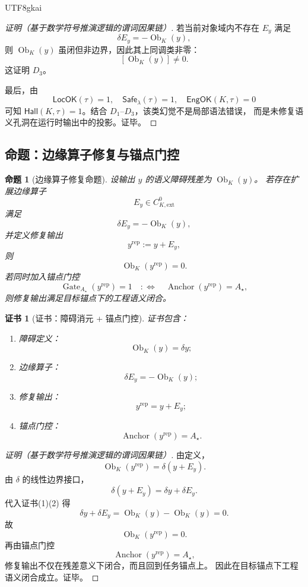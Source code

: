\documentclass[12pt]{article}
\newtheorem{proposition}{命题}[section]
\newtheorem{Certificate}{证书}[section]
\newcommand{\Safe}{\mathsf{Safe}}
\newcommand{\LocOK}{\mathsf{LocOK}}
\newcommand{\EngOK}{\mathsf{EngOK}}
\newcommand{\Hall}{\mathsf{Hall}}
\newcommand{\Anchor}{\operatorname{Anchor}}
\newcommand{\Gate}{\operatorname{Gate}}
\newcommand{\Ob}{\operatorname{Ob}}
\begin{document}
\begin{CJK*}{UTF8}{gkai}
\begin{proof}[证明（基于数学符号推演逻辑的谓词因果链）]
若当前对象域内不存在 \(E_y\) 满足
\[
  \delta E_y=-\Ob_K(y),
\]
则 \(\Ob_K(y)\) 虽闭但非边界，因此其上同调类非零：
\[
  [\Ob_K(y)]\ne 0.
\]
这证明 \(D_3\)。

最后，由
\[
  \LocOK(\tau)=1,\quad \Safe_\lambda(\tau)=1,\quad \EngOK(K,\tau)=0
\]
可知 \(\Hall(K,\tau)=1\)。结合 \(D_1\)--\(D_3\)，该类幻觉不是局部语法错误，
而是未修复语义孔洞在运行时输出中的投影。证毕。
\end{proof}

\subsection{命题：边缘算子修复与锚点门控}
\label{subsec:tex51-repair}

\begin{proposition}[边缘算子修复命题]
\label{prop:tex51-edge-repair}
设输出 \(y\) 的语义障碍残差为 \(\Ob_K(y)\)。
若存在扩展边缘算子
\[
  E_y\in C^0_{K,\mathrm{ext}}
\]
满足
\[
  \delta E_y=-\Ob_K(y),
\]
并定义修复输出
\[
  y^{\mathrm{rep}}:=y+E_y,
\]
则
\[
  \Ob_K(y^{\mathrm{rep}})=0.
\]
若同时加入锚点门控
\[
  \Gate_{A_\star}(y^{\mathrm{rep}})=1
  \quad:\Longleftrightarrow\quad
  \Anchor(y^{\mathrm{rep}})=A_\star,
\]
则修复输出满足目标锚点下的工程语义闭合。
\end{proposition}

\begin{Certificate}[证书：障碍消元 + 锚点门控]
\label{cert:tex51-edge-repair}
证书包含：
\begin{enumerate}
  \item 障碍定义：
  \[
    \Ob_K(y)=\delta y;
  \]
  \item 边缘算子：
  \[
    \delta E_y=-\Ob_K(y);
  \]
  \item 修复输出：
  \[
    y^{\mathrm{rep}}=y+E_y;
  \]
  \item 锚点门控：
  \[
    \Anchor(y^{\mathrm{rep}})=A_\star.
  \]
\end{enumerate}
\end{Certificate}

\begin{proof}[证明（基于数学符号推演逻辑的谓词因果链）]
由定义，
\[
  \Ob_K(y^{\mathrm{rep}})
  =
  \delta(y+E_y).
\]
由 \(\delta\) 的线性边界接口，
\[
  \delta(y+E_y)=\delta y+\delta E_y.
\]
代入证书(1)(2) 得
\[
  \delta y+\delta E_y
  =
  \Ob_K(y)-\Ob_K(y)
  =
  0.
\]
故
\[
  \Ob_K(y^{\mathrm{rep}})=0.
\]
再由锚点门控
\[
  \Anchor(y^{\mathrm{rep}})=A_\star,
\]
修复输出不仅在残差意义下闭合，而且回到任务锚点上。
因此在目标锚点下工程语义闭合成立。证毕。
\end{proof}


\end{CJK*}
\end{document}
